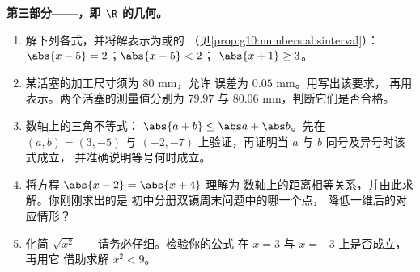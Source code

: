 \begin{problem}
\medskip
\noindent\textbf{第三部分——，即
$\R$ 的几何。}
\begin{enumerate}[resume]
  \item 解下列各式，并将解表示为或的
        （见\cref{prop:g10:numbers:absinterval}）：
        $\abs{x - 5} = 2$；\quad $\abs{x - 5} < 2$；\quad
        $\abs{x + 1} \geq 3$。
  \item 某活塞的加工尺寸须为 $80$ mm，允许
        误差为 $0.05$ mm。用写出该要求，
        再用表示。两个活塞的测量值分别为
        $79.97$ 与 $80.06$ mm，判断它们是否合格。
  \item 数轴上的三角不等式：
        $\abs{a + b} \leq \abs a + \abs b$。先在
        $(a, b) = (3, -5)$ 与 $(-2, -7)$ 上验证，再证明当 $a$ 与
        $b$ 同号及异号时该式成立，
        并准确说明等号何时成立。
  \item 将方程 $\abs{x - 2} = \abs{x + 4}$ 理解为
        数轴上的距离相等关系，并由此求解。你刚刚求出的是
        初中分册双镜周末问题中的哪一个点，
        降低一维后的对应情形？
  \item 化简 $\sqrt{x^2}$——请务必仔细。检验你的公式
        在 $x = 3$ 与 $x = -3$ 上是否成立，再用它
        借助求解 $x^2 < 9$。
\end{enumerate}


\end{problem}
